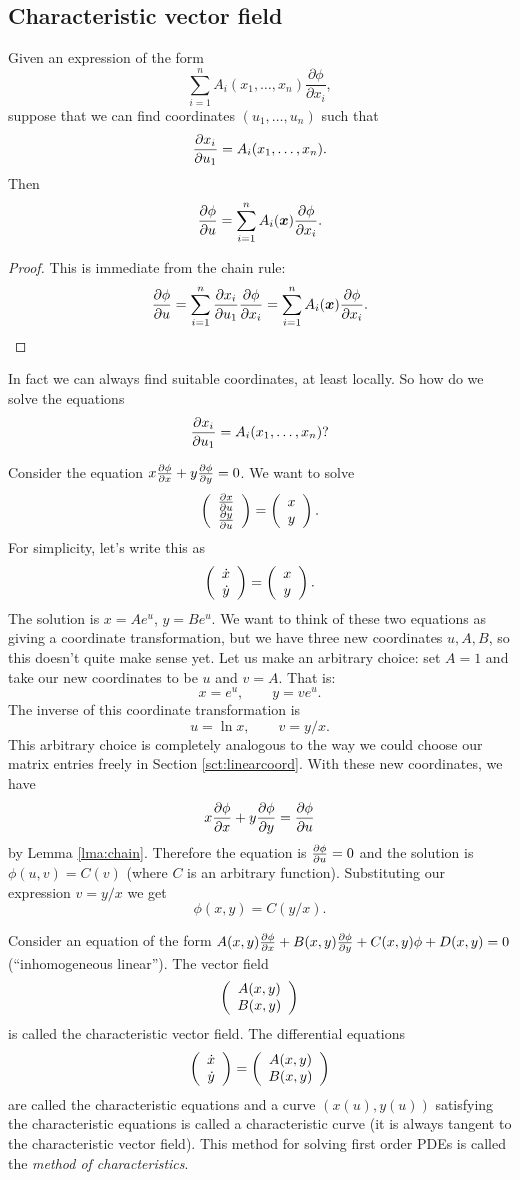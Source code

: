 \subsection{Characteristic vector field}

\begin{lma}\label{lma:chain}
Given an expression of the form
\[\sum_{i=1}^nA_i(x_1,\ldots,x_n)\frac{\partial\phi}{\partial x_i},\]
suppose that we can find coordinates $(u_1,\ldots,u_n)$ such that
\[\frac{\partial x_i}{\partial u_1}=A_i(x_1,\ldots,x_n).\]
Then
\[\frac{\partial \phi}{\partial u}=\sum_{i=1}^nA_i(\boldsymbol{x})\frac{\partial \phi}{\partial x_i}.\]
\end{lma}
\begin{proof}
This is immediate from the chain rule:
\[\frac{\partial \phi}{\partial u}=\sum_{i=1}^n\frac{\partial x_i}{\partial u_1}\frac{\partial \phi}{\partial x_i}=\sum_{i=1}^nA_i(\boldsymbol{x})\frac{\partial \phi}{\partial x_i}.\]
\end{proof}

In fact we can always find suitable coordinates, at least locally. So how do we solve the equations
\[\frac{\partial x_i}{\partial u_1}=A_i(x_1,\ldots,x_n)?\]

\begin{exm}
Consider the equation $x\frac{\partial \phi}{\partial x}+y\frac{\partial \phi}{\partial y}=0$. We want to solve
\[\left(\begin{array}{c}\frac{\partial x}{\partial u}\\\frac{\partial y}{\partial u}\end{array}\right)=\left(\begin{array}{c}x\\y\end{array}\right).\]
For simplicity, let's write this as
\[\left(\begin{array}{c}\dot{x}\\\dot{y}\end{array}\right)=\left(\begin{array}{c}x\\y\end{array}\right).\]
The solution is $x=Ae^u$, $y=Be^u$. We want to think of these two equations as giving a coordinate transformation, but we have three new coordinates $u,A,B$, so this doesn't quite make sense yet. Let us make an arbitrary choice: set $A=1$ and take our new coordinates to be $u$ and $v=A$. That is:
\[x=e^u,\qquad y=ve^u.\]
The inverse of this coordinate transformation is
\[u=\ln x,\qquad v=y/x.\]
This arbitrary choice is completely analogous to the way we could choose our matrix entries freely in Section \ref{sct:linearcoord}. With these new coordinates, we have
\[x\frac{\partial \phi}{\partial x}+y\frac{\partial \phi}{\partial y}=\frac{\partial \phi}{\partial u}\]
by Lemma \ref{lma:chain}. Therefore the equation is $\frac{\partial \phi}{\partial u}=0$ and the solution is $\phi(u,v)=C(v)$ (where $C$ is an arbitrary function). Substituting our expression $v=y/x$ we get
\[\phi(x,y)=C(y/x).\]
\end{exm}

\begin{dfn}
Consider an equation of the form $A(x,y)\frac{\partial \phi}{\partial x}+B(x,y)\frac{\partial \phi}{\partial y}+C(x,y)\phi+D(x,y)=0$ (``inhomogeneous linear''). The vector field
\[\left(\begin{array}{c}A(x,y)\\B(x,y)\end{array}\right)\]
is called the characteristic vector field. The differential equations
\[\left(\begin{array}{c}\dot{x}\\\dot{y}\end{array}\right)=\left(\begin{array}{c}A(x,y)\\B(x,y)\end{array}\right)\]
are called the characteristic equations and a curve $(x(u),y(u))$ satisfying the characteristic equations is called a characteristic curve (it is always tangent to the characteristic vector field). This method for solving first order PDEs is called the {\em method of characteristics}.
\end{dfn}

